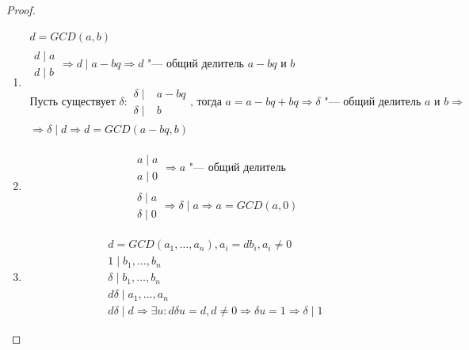 \begin{proof}
	\begin{enumerate}
	\item
	\begin{gather*}
		d = GCD\left(a, b\right) \\
		\begin{array}{c} d \mid a\\ d \mid b \end{array} \Rightarrow d \mid a - bq \Rightarrow d 
		\text{ "--- общий делитель } a-bq \text{ и } b \\
		\text{Пусть существует } \delta \colon \begin{aligned} \delta \mid& a - bq \\ \delta \mid& b \end{aligned}
		\text{, тогда } a = a - bq + bq \Rightarrow \delta \text{ "--- общий делитель } a \text{ и } b \Rightarrow \\
		\Rightarrow \delta \mid d \Rightarrow d = GCD\left(a - bq, b\right)
	\end{gather*}
	\item
	\begin{gather*}
		\begin{array}{c} a \mid a \\ a \mid 0 \end{array} \Rightarrow a \text{ "--- общий делитель} \\
		\begin{array}{c} \delta \mid a \\ \delta \mid 0 \end{array} \Rightarrow \delta \mid a \Rightarrow a = GCD\left(a, 0\right)
	\end{gather*}
	\item
	\begin{gather*}
		d = GCD\left(a_{1}, \dots, a_{n}\right), a_{i} = db_{i}, a_{i} \neq 0 \\
		1 \mid b_{1}, \dots, b_{n} \\
		\delta \mid b_{1}, \dots, b_{n} \\
		d\delta \mid a_{1}, \dots, a_{n} \\
		d\delta \mid d \Rightarrow \exists u \colon d\delta u = d, d \neq 0  \Rightarrow \delta u = 1 \Rightarrow \delta \mid 1
	\end{gather*}
	\end{enumerate}
\end{proof}

